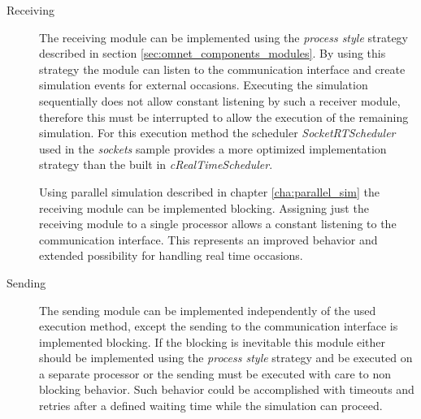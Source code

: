 \begin{description}
    \item[Receiving] The receiving module can be implemented using the \emph{process style} strategy described in section \ref{sec:omnet_components_modules}.
    By using this strategy the module can listen to the communication interface and create simulation events for external occasions.
    Executing the simulation sequentially does not allow constant listening by such a receiver module, therefore this must be interrupted to allow the execution of the remaining simulation.
    For this execution method the scheduler \emph{SocketRTScheduler} used in the \emph{sockets} sample provides a more optimized implementation strategy than the built in \emph{cRealTimeScheduler}.
    
    Using parallel simulation described in chapter \ref{cha:parallel_sim} the receiving module can be implemented blocking.
    Assigning just the receiving module to a single processor allows a constant listening to the communication interface.
    This represents an improved behavior and extended possibility for handling real time occasions.
    
    \item[Sending] The sending module can be implemented independently of the used execution method, except the sending to the communication interface is implemented blocking.
    If the blocking is inevitable this module either should be implemented using the \emph{process style} strategy and be executed on a separate processor or the sending must be executed with care to non blocking behavior.
    Such behavior could be accomplished with timeouts and retries after a defined waiting time while the simulation can proceed.
\end{description}